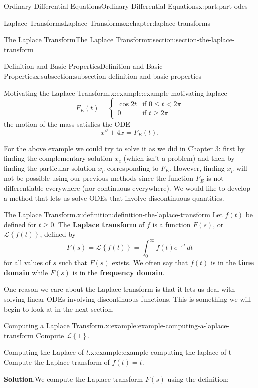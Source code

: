 \documentclass[twoside,10pt,]{book}
\newcommand{\blocktitlefont}{\relax}
\newcommand{\terminology}[1]{\textbf{#1}}
\numberwithin{equation}{part}
\newcommand{\Int}[2]{\int_{#1}^{#2}}
\newcommand{\lt}{<}
\newcommand{\amp}{&}
\begin{document}
\begin{partptx}{Ordinary Differential Equations}{}{Ordinary Differential Equations}{}{}{x:part:part-odes}
\begin{chapterptx}{Laplace Transforms}{}{Laplace Transforms}{}{}{x:chapter:laplace-transforms}
\begin{sectionptx}{The Laplace Transform}{}{The Laplace Transform}{}{}{x:section:section-the-laplace-transform}
\begin{subsectionptx}{Definition and Basic Properties}{}{Definition and Basic Properties}{}{}{x:subsection:subsection-definition-and-basic-properties}
\begin{example}{Motivating the Laplace Transform.}{x:example:example-motivating-laplace}
\begin{equation*}
F_{E}(t) = 
\begin{cases}
\cos2t \amp \text{if }0\leq t\lt 2\pi\\
0 \amp\text{if } t\geq2\pi  
\end{cases}
\end{equation*}
the motion of the mass satisfies the ODE%
\begin{equation*}
x''+4x = F_{E}(t).
\end{equation*}
%
\end{example}
For the above example we could try to solve it as we did in Chapter 3: first by finding the complementary solution \(x_{c}\) (which isn't a problem) and then by finding the particular solution \(x_{p}\) corresponding to \(F_{E}\). However, finding \(x_{p}\) will not be possible using our previous methods since the function \(F_{E}\) is not differentiable everywhere (nor continuous everywhere). We would like to develop a method that lets us solve ODEs that involve discontinuous quantities.%
\begin{definition}{The Laplace Transform.}{x:definition:definition-the-laplace-transform}%
Let \(f(t)\) be defined for \(t\geq0\). The \terminology{Laplace transform} of \(f\) is a function \(F(s)\), or \(\mathcal{L}\left\{ f(t) \right\}\), defined by%
\begin{equation*}
F(s) = \mathcal{L}\left\{ f(t) \right\} = \Int{0}{\infty}f(t)e^{-st}\,dt
\end{equation*}
for all values of \(s\) such that \(F(s)\) exists. We often say that \(f(t)\) is in the \terminology{time domain} while \(F(s)\) is in the \terminology{frequency domain}.%
\end{definition}
One reason we care about the Laplace transform is that it lets us deal with solving linear ODEs involving discontinuous functions. This is something we will begin to look at in the next section.%
\begin{example}{Computing a Laplace Transform.}{x:example:example-computing-a-laplace-transform}%
Compute \(\mathcal{L}\left\{ 1 \right\}\).%
\end{example}
\begin{example}{Computing the Laplace of \(t\).}{x:example:example-computing-the-laplace-of-t-}%
Compute the Laplace transform of \(f(t) = t\).%
\par\smallskip%
\noindent\textbf{\blocktitlefont Solution}.\hypertarget{g:solution:idp105548816587296}{}\quad{}We compute the Laplace transform \(F(s)\) using the definition:%
\begin{align*}

\end{align*}
\end{example}
\end{subsectionptx}
\end{sectionptx}
\end{chapterptx}
\end{partptx}
\end{document}
